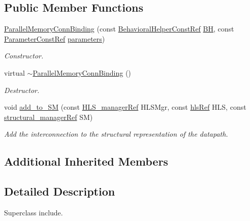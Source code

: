 \subsection*{Public Member Functions}
\begin{DoxyCompactItemize}
\item 
\hyperlink{classParallelMemoryConnBinding_a51b30466ed129d8391c0af95e7ea02cb}{Parallel\+Memory\+Conn\+Binding} (const \hyperlink{behavioral__helper_8hpp_aae973b54cac87eef3b27442aa3e1e425}{Behavioral\+Helper\+Const\+Ref} \hyperlink{classconn__binding_a10ef50de9953e2267264484077bdbfdb}{BH}, const \hyperlink{Parameter_8hpp_a37841774a6fcb479b597fdf8955eb4ea}{Parameter\+Const\+Ref} \hyperlink{classconn__binding_a2fea3ae9e3d6941856636531c50c6ff6}{parameters})
\begin{DoxyCompactList}\small\item\em Constructor. \end{DoxyCompactList}\item 
virtual \hyperlink{classParallelMemoryConnBinding_a739b6a78e3485ac3cf3d6ad88093b07e}{$\sim$\+Parallel\+Memory\+Conn\+Binding} ()
\begin{DoxyCompactList}\small\item\em Destructor. \end{DoxyCompactList}\item 
void \hyperlink{classParallelMemoryConnBinding_a269ef0bbe0925ec814787b9d3b5a54bf}{add\+\_\+to\+\_\+\+SM} (const \hyperlink{hls__manager_8hpp_acd3842b8589fe52c08fc0b2fcc813bfe}{H\+L\+S\+\_\+manager\+Ref} H\+L\+S\+Mgr, const \hyperlink{hls_8hpp_a75d0c73923d0ddfa28c4843a802c73a7}{hls\+Ref} H\+LS, const \hyperlink{structural__manager_8hpp_ab3136f0e785d8535f8d252a7b53db5b5}{structural\+\_\+manager\+Ref} SM)
\begin{DoxyCompactList}\small\item\em Add the interconnection to the structural representation of the datapath. \end{DoxyCompactList}\end{DoxyCompactItemize}
\subsection*{Additional Inherited Members}


\subsection{Detailed Description}
Superclass include. 

